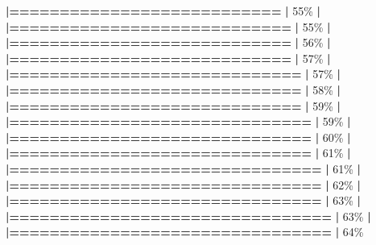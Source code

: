 \documentclass[
]{book}
\newenvironment{Shaded}{\begin{snugshade}}{\end{snugshade}}
\newcommand{\DecValTok}[1]{\textcolor[rgb]{0.00,0.00,0.81}{#1}}
\newcommand{\ErrorTok}[1]{\textcolor[rgb]{0.64,0.00,0.00}{\textbf{#1}}}
\newcommand{\NormalTok}[1]{#1}
\newcommand{\SpecialCharTok}[1]{\textcolor[rgb]{0.81,0.36,0.00}{\textbf{#1}}}
\begin{document}
\begin{Shaded}
\begin{Highlighting}[]
  \ErrorTok{|===========================}                       \ErrorTok{|}  \DecValTok{55}\NormalTok{\%}
  \SpecialCharTok{|}                                                        
  \ErrorTok{|============================}                      \ErrorTok{|}  \DecValTok{55}\NormalTok{\%}
  \SpecialCharTok{|}                                                        
  \ErrorTok{|============================}                      \ErrorTok{|}  \DecValTok{56}\NormalTok{\%}
  \SpecialCharTok{|}                                                        
  \ErrorTok{|============================}                      \ErrorTok{|}  \DecValTok{57}\NormalTok{\%}
  \SpecialCharTok{|}                                                        
  \ErrorTok{|=============================}                     \ErrorTok{|}  \DecValTok{57}\NormalTok{\%}
  \SpecialCharTok{|}                                                        
  \ErrorTok{|=============================}                     \ErrorTok{|}  \DecValTok{58}\NormalTok{\%}
  \SpecialCharTok{|}                                                        
  \ErrorTok{|=============================}                     \ErrorTok{|}  \DecValTok{59}\NormalTok{\%}
  \SpecialCharTok{|}                                                        
  \ErrorTok{|==============================}                    \ErrorTok{|}  \DecValTok{59}\NormalTok{\%}
  \SpecialCharTok{|}                                                        
  \ErrorTok{|==============================}                    \ErrorTok{|}  \DecValTok{60}\NormalTok{\%}
  \SpecialCharTok{|}                                                        
  \ErrorTok{|==============================}                    \ErrorTok{|}  \DecValTok{61}\NormalTok{\%}
  \SpecialCharTok{|}                                                        
  \ErrorTok{|===============================}                   \ErrorTok{|}  \DecValTok{61}\NormalTok{\%}
  \SpecialCharTok{|}                                                        
  \ErrorTok{|===============================}                   \ErrorTok{|}  \DecValTok{62}\NormalTok{\%}
  \SpecialCharTok{|}                                                        
  \ErrorTok{|===============================}                   \ErrorTok{|}  \DecValTok{63}\NormalTok{\%}
  \SpecialCharTok{|}                                                        
  \ErrorTok{|================================}                  \ErrorTok{|}  \DecValTok{63}\NormalTok{\%}
  \SpecialCharTok{|}                                                        
  \ErrorTok{|================================}                  \ErrorTok{|}  \DecValTok{64}\NormalTok{\%}

\end{Highlighting}
\end{Shaded}
\end{document}
